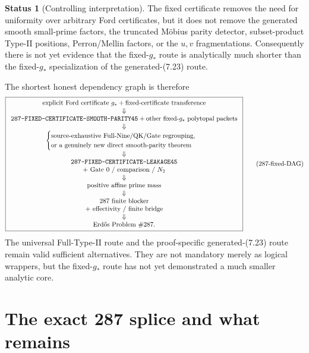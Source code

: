 \documentclass[11pt]{article}
\theoremstyle{definition}
\newtheorem{status}[theorem]{Status}
\theoremstyle{remark}
\newcommand{\1}{\mathbf 1}
\begin{document}
\begin{status}[Controlling interpretation]
The fixed certificate removes the need for uniformity over arbitrary Ford certificates, but it does not remove
the generated smooth small-prime factors, the truncated M\"obius parity detector, subset-product Type-II
positions, Perron/Mellin factors, or the $u,v$ fragmentations.  Consequently there is not yet evidence that the
fixed-$g_*$ route is analytically much shorter than the fixed-$g_*$ specialization of the generated-(7.23)
route.
\end{status}

The shortest honest dependency graph is therefore
\[
\boxed{
\begin{array}{c}
\text{explicit Ford certificate }g_*+
\text{fixed-certificate transference}\\
\Downarrow\\
\texttt{287-FIXED-CERTIFICATE-SMOOTH-PARITY45}
+\text{other fixed-}g_*\text{ polytopal packets}\\
\Downarrow\\
\begin{cases}
\text{source-exhaustive Full-Nine/QK/Gate regrouping},\\
\text{or a genuinely new direct smooth-parity theorem}
\end{cases}\\
\Downarrow\\
\texttt{287-FIXED-CERTIFICATE-LEAKAGE45}\\
+\ \text{Gate 0 / comparison / }N_2\\
\Downarrow\\
\text{positive affine prime mass}\\
\Downarrow\\
\text{287 finite blocker}\\
+\ \text{effectivity / finite bridge}\\
\Downarrow\\
\text{Erd\H{o}s Problem \#287}.
\end{array}}
\tag{287-fixed-DAG}
\]
The universal Full-Type-II route and the proof-specific generated-(7.23) route remain valid sufficient
alternatives.  They are not mandatory merely as logical wrappers, but the fixed-$g_*$ route has not yet
demonstrated a much smaller analytic core.

\part{The exact 287 splice and what remains}
\end{document}

